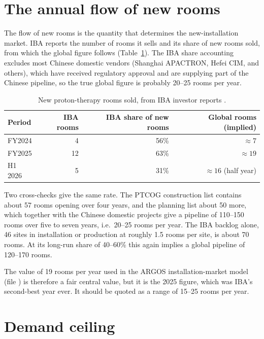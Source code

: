 \documentclass[11pt,a4paper]{article}
\begin{document}
\section{The annual flow of new rooms}

The flow of new rooms is the quantity that determines the new-installation
market. IBA reports the number of rooms it sells and its share of new rooms sold,
from which the global figure follows (Table~\ref{tab:flow}). The IBA share
accounting excludes most Chinese domestic vendors (Shanghai APACTRON, Hefei
CIM, and others), which have received regulatory approval and are supplying
part of the Chinese pipeline, so the true global figure is probably 20--25 rooms
per year.

\begin{table}[h]
\centering
\caption{New proton-therapy rooms sold, from IBA investor reports \cite{iba_fy25,iba_h1_26}.}
\label{tab:flow}
\begin{tabular}{@{}lrrr@{}}
\toprule
Period & IBA rooms & IBA share of new rooms & Global rooms (implied) \\
\midrule
FY2024 & 4  & 56\% & $\approx 7$ \\
FY2025 & 12 & 63\% & $\approx 19$ \\
H1 2026 & 5 & 31\% & $\approx 16$ (half year) \\
\bottomrule
\end{tabular}
\end{table}

Two cross-checks give the same rate. The PTCOG construction list contains about
57 rooms opening over four years, and the planning list about 50 more, which
together with the Chinese domestic projects give a pipeline of 110--150 rooms
over five to seven years, i.e.\ 20--25 rooms per year. The IBA backlog alone,
46 sites in installation or production at roughly 1.5 rooms per site, is about
70 rooms. At its long-run share of 40--60\% this again implies a global pipeline
of 120--170 rooms.

The value of 19 rooms per year used in the ARGOS installation-market model
(file ) is therefore a fair central
value, but it is the 2025 figure, which was IBA's second-best year ever. It
should be quoted as a range of 15--25 rooms per year.

\section{Demand ceiling}
\end{document}
